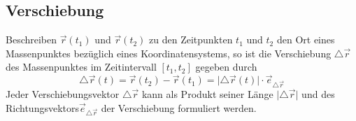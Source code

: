 \subsection{Verschiebung}
Beschreiben $\overrightarrow{r}\left(t_1\right)$ und $\overrightarrow{r}\left(t_2\right)$ zu den Zeitpunkten $t_1$ und $t_2$ den Ort eines Massenpunktes bezüglich eines Koordinatensystems, so ist die Verschiebung $\triangle \overrightarrow{r}$ des Massenpunktes im Zeitintervall $[t_1, t_2]$ gegeben durch
\begin{equation}
\boxed{\triangle \overrightarrow{r}\left(t\right)=\overrightarrow{r}\left(t_2\right)-\overrightarrow{r}\left(t_1\right)=\Big\vert \triangle \overrightarrow{r}\left(t\right)\Big\vert\cdot \overrightarrow{e}_{\triangle \overrightarrow{r}}}
\end{equation}
Jeder Verschiebungsvektor $\triangle \overrightarrow{r}$ kann als Produkt seiner Länge $\Big\vert \triangle \overrightarrow{r}\Big\vert$ und des Richtungsvektors$\overrightarrow{e}_{\triangle \overrightarrow{r}}$ der Verschiebung formuliert werden.  
